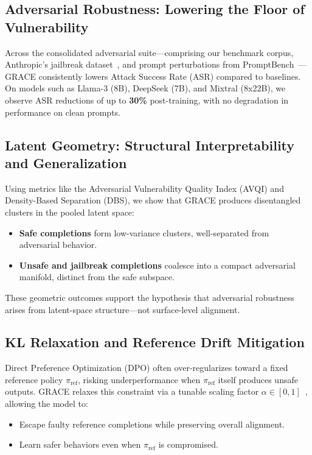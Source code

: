 \vspace{1mm}
\subsection*{Adversarial Robustness: Lowering the Floor of Vulnerability}

Across the consolidated adversarial suite—comprising our benchmark corpus, Anthropic’s jailbreak dataset~\cite{perez2022red}, and prompt perturbations from PromptBench~\cite{zhu2024promptbench}—\textsc{GRACE} consistently lowers Attack Success Rate (ASR) compared to baselines. On models such as Llama-3 (8B), DeepSeek (7B), and Mixtral (8x22B), we observe ASR reductions of up to \textbf{30\%} post-training, with no degradation in performance on clean prompts.

\vspace{1mm}
\subsection*{Latent Geometry: Structural Interpretability and Generalization}

Using metrics like the Adversarial Vulnerability Quality Index (AVQI) and Density-Based Separation (DBS), we show that \textsc{GRACE} produces disentangled clusters in the pooled latent space:
\begin{itemize}[leftmargin=1.5em]
    \item \textbf{Safe completions} form low-variance clusters, well-separated from adversarial behavior.
    \item \textbf{Unsafe and jailbreak completions} coalesce into a compact adversarial manifold, distinct from the safe subspace.
\end{itemize}






These geometric outcomes support the hypothesis that adversarial robustness arises from latent-space structure—not surface-level alignment.

\vspace{1mm}
\subsection*{KL Relaxation and Reference Drift Mitigation}

Direct Preference Optimization (DPO) often over-regularizes toward a fixed reference policy \(\pi_{\mathrm{ref}}\), risking underperformance when \(\pi_{\mathrm{ref}}\) itself produces unsafe outputs. \textsc{GRACE} relaxes this constraint via a tunable scaling factor \(\alpha \in [0,1]\)~\cite{wu2024generalized, chen2023epsilon}, allowing the model to:
\begin{itemize}[leftmargin=1.5em]
    \item Escape faulty reference completions while preserving overall alignment.
    \item Learn safer behaviors even when \(\pi_{\mathrm{ref}}\) is compromised.
\end{itemize}

